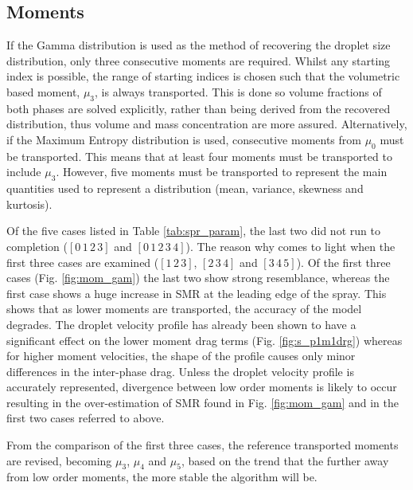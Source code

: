 \documentclass[a4paper,10pt]{article}
\begin{document}
\subsection{Moments} \label{ssec:moments} %
If the Gamma distribution is used as the method of recovering the droplet size distribution, only three consecutive moments are required. Whilst any starting index is possible, the range of starting indices is chosen such that the volumetric based moment, $\mu_3$, is always transported. This is done so volume fractions of both phases are solved explicitly, rather than being derived from the recovered distribution, thus volume and mass concentration are more assured. Alternatively, if the Maximum Entropy distribution is used, consecutive moments from $\mu_0$ must be transported. This means that at least four moments must be transported to include $\mu_3$. However, five moments must be transported to represent the main quantities used to represent a distribution (mean, variance, skewness and kurtosis).

Of the five cases listed in Table \ref{tab:spr_param}, the last two did not run to completion ($[0\,1\,2\,3]$ and ${[0\,1\,2\,3\,4]}$). The reason why comes to light when the first three cases are examined ($[1\,2\,3]$, $[2\,3\,4]$ and $[3\,4\,5]$). Of the first three cases (Fig. \ref{fig:mom_gam}) the last two show strong resemblance, whereas the first case shows a huge increase in SMR at the leading edge of the spray. This shows that as lower moments are transported, the accuracy of the model degrades. The droplet velocity profile has already been shown to have a significant effect on the lower moment drag terms (Fig. \ref{fig:s_p1m1drg}) whereas for higher moment velocities, the shape of the profile causes only minor differences in the inter-phase drag. Unless the droplet velocity profile is accurately represented, divergence between low order moments is likely to occur resulting in the over-estimation of SMR found in Fig. \ref{fig:mom_gam} and in the first two cases referred to above.

From the comparison of the first three cases, the reference transported moments are revised, becoming $\mu_3$, $\mu_4$ and $\mu_5$, based on the trend that the further away from low order moments, the more stable the algorithm will be.
\end{document}
